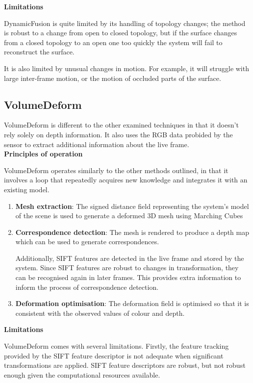 \documentclass[a4paper]{article}
\begin{document}
\noindent\textbf{Limitations}

DynamicFusion is quite limited by its handling of topology changes; the method is robust to a change from open to closed topology, but if the surface changes from a closed topology to an open one too quickly the system will fail to reconstruct the surface.

It is also limited by unusual changes in motion. For example, it will struggle with large inter-frame motion, or the motion of occluded parts of the surface.


\subsection{VolumeDeform}

VolumeDeform is different to the other examined techniques in that it doesn't rely solely on depth information. It also uses the RGB data probided by the sensor to extract additional information about the live frame.\\ 


\noindent\textbf{Principles of operation}

VolumeDeform operates similarly to the other methods outlined, in that it involves a loop that repeatedly acquires new knowledge and integrates it with an existing model.

\begin{enumerate}
\item \textbf{Mesh extraction}: The signed distance field representing the system's model of the scene is used to generate a deformed 3D mesh using Marching Cubes
\item \textbf{Correspondence detection}: The mesh is rendered to produce a depth map which can be used to generate correspondences. 

Additionally, SIFT features are detected in the live frame and stored by the system. Since SIFT features are robust to changes in transformation, they can be recognised again in later frames. This provides extra information to inform the process of correspondence detection. 

\item \textbf{Deformation optimisation}: The deformation field is optimised so that it is consistent with the observed values of colour and depth.
\end{enumerate}

\noindent\textbf{Limitations}

VolumeDeform comes with several limitations. Firstly, the feature tracking provided by the SIFT feature descriptor is not adequate when significant transformations are applied. SIFT feature descriptors are robust, but not robust enough given the computational resources available.
\end{document}
